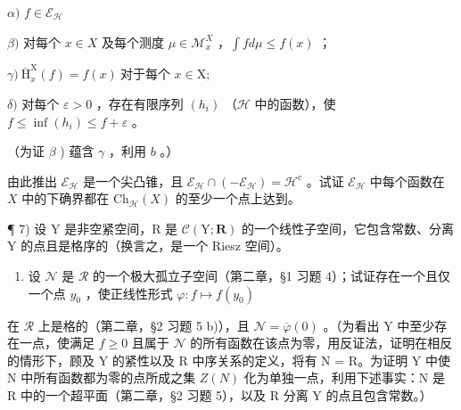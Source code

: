 \(\alpha)\) \(f\in \mathcal{E}_{\mathcal{H}}\)

\(\beta)\) 对每个 \(x \in X\) 及每个测度 \(\mu \in \mathcal{M}_x^X\) ，\(\int f d\mu \leqslant f(x)\) ；

\(\gamma)\ \overline{\mathrm{H}}_{x}^{\mathrm{X}}(f) = f(x)\ \text{对于每个 } x \in \mathrm{X};\)

\(\delta)\) 对每个 \(\varepsilon > 0\) ，存在有限序列 \((h_i)\) （\(\mathcal{H}\) 中的函数），使 \(f \leqslant \inf(h_i) \leqslant f + \varepsilon\) 。

（为证 \(\beta\) ) 蕴含 \(\gamma\) ，利用 \(b\) 。）

由此推出 \(\mathcal{E}_{\mathcal{H}}\) 是一个尖凸锥，且 \(\mathcal{E}_{\mathcal{H}} \cap (-\mathcal{E}_{\mathcal{H}}) = \mathcal{H}^c\) 。试证 \(\mathcal{E}_{\mathcal{H}}\) 中每个函数在 \(X\) 中的下确界都在 \(\mathrm{Ch}_{\mathcal{H}}(X)\) 的至少一个点上达到。

¶ 7) 设 Y 是非空紧空间，R 是 \(\mathcal{C}(\mathrm{Y};\mathbf{R})\) 的一个线性子空间，它包含常数、分离 Y 的点且是格序的（换言之，是一个 Riesz 空间）。

\begin{enumerate}
\def\labelenumi{\alph{enumi})}
\tightlist
\item
  设 \(\mathcal{N}\) 是 \(\mathcal{R}\) 的一个极大孤立子空间（第二章，§1 习题 4）；试证存在一个且仅一个点 \(y_0\) ，使正线性形式 \(\varphi : f \mapsto f(y_0)\)
\end{enumerate}

在 \(\mathcal{R}\) 上是格的（第二章，§2 习题 5 b)），且 \(\mathcal{N} = \overline{\varphi}(0)\) 。（为看出 Y 中至少存在一点，使满足 \(f \geqslant 0\) 且属于 \(\mathcal{N}\) 的所有函数在该点为零，用反证法，证明在相反的情形下，顾及 Y 的紧性以及 R 中序关系的定义，将有 N = R。为证明 Y 中使 N 中所有函数都为零的点所成之集 \(Z(N)\) 化为单独一点，利用下述事实：N 是 R 中的一个超平面（第二章，§2 习题 5），以及 R 分离 Y 的点且包含常数。）

